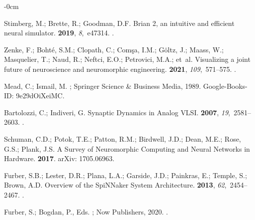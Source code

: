 \documentclass[brainsci, %
               review,submit,pdftex,moreauthors
               ]{Definitions/mdpi}
\begin{document}
\begin{adjustwidth}{-\extralength}{0cm}
\begin{thebibliography}{999}
  Stimberg, M.; Brette, R.; Goodman, D.F.
  \newblock Brian 2, an intuitive and efficient neural simulator.
   {\bf 2019}, {\em 8},~e47314.
  .
  
  Zenke, F.; Bohté, S.M.; Clopath, C.; Comşa, I.M.; Göltz, J.; Maass, W.;
    Masquelier, T.; Naud, R.; Neftci, E.O.; Petrovici, M.A.;  et~al.
  \newblock Visualizing a joint future of neuroscience and neuromorphic
    engineering.
   {\bf 2021}, {\em 109},~571--575.
  .
  
  Mead, C.; Ismail, M.
  ; Springer
    Science \& Business Media,  1989.
  \newblock Google-Books-ID: 9e29dOiXeiMC.
  
  Bartolozzi, C.; Indiveri, G.
  \newblock Synaptic {Dynamics} in {Analog} {VLSI}.
   {\bf 2007}, {\em 19},~2581--2603.
  .
  
  Schuman, C.D.; Potok, T.E.; Patton, R.M.; Birdwell, J.D.; Dean, M.E.; Rose,
    G.S.; Plank, J.S.
  \newblock A {Survey} of {Neuromorphic} {Computing} and {Neural} {Networks} in
    {Hardware}.
   {\bf 2017}.
  \newblock arXiv: 1705.06963.
  
  Furber, S.B.; Lester, D.R.; Plana, L.A.; Garside, J.D.; Painkras, E.; Temple,
    S.; Brown, A.D.
  \newblock Overview of the {SpiNNaker} {System} {Architecture}.
   {\bf 2013}, {\em
    62},~2454--2467.
  .
  
  Furber, S.; Bogdan, P., Eds.
  ;
    Now Publishers,  2020.
  .
  

\end{thebibliography}
\end{adjustwidth}
\end{document}
